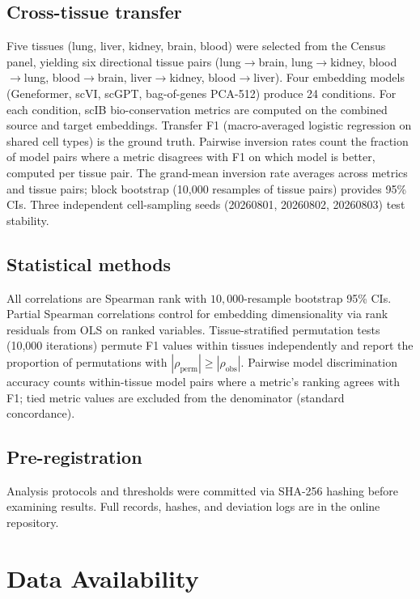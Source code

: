 \documentclass[11pt]{article}
\begin{document}
\subsection{Cross-tissue transfer}
\label{sec:crosstissuemethod}

Five tissues (lung, liver, kidney, brain, blood) were selected from the
Census panel, yielding six directional tissue pairs (lung$\to$brain,
lung$\to$kidney, blood$\to$lung, blood$\to$brain, liver$\to$kidney,
blood$\to$liver). Four embedding models (Geneformer, scVI, scGPT,
bag-of-genes PCA-512) produce 24 conditions. For each condition, scIB
bio-conservation metrics are computed on the combined source and target
embeddings. Transfer F1 (macro-averaged logistic regression on shared
cell types) is the ground truth. Pairwise inversion rates count the
fraction of model pairs where a metric disagrees with F1 on which model
is better, computed per tissue pair. The grand-mean inversion rate
averages across metrics and tissue pairs; block bootstrap (10,000
resamples of tissue pairs) provides 95\% CIs. Three independent
cell-sampling seeds (20260801, 20260802, 20260803) test stability.

\subsection{Statistical methods}

All correlations are Spearman rank with $10{,}000$-resample bootstrap
95\% CIs. Partial Spearman correlations control for embedding
dimensionality via rank residuals from OLS on ranked variables.
Tissue-stratified permutation tests (10,000 iterations) permute F1
values within tissues independently and report the proportion of
permutations with $|\rho_{\mathrm{perm}}| \geq |\rho_{\mathrm{obs}}|$.
Pairwise model discrimination accuracy counts within-tissue model pairs
where a metric's ranking agrees with F1; tied metric values are excluded
from the denominator (standard concordance).

\subsection{Pre-registration}

Analysis protocols and thresholds were committed via SHA-256 hashing
before examining results. Full records, hashes, and deviation logs are
in the online repository.


\section*{Data Availability}
\end{document}
